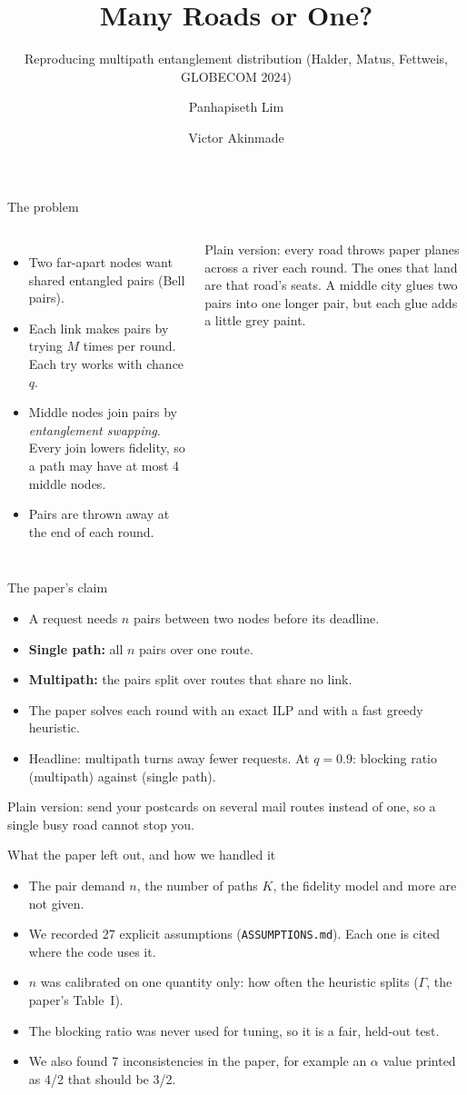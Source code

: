 \documentclass[aspectratio=169,11pt]{beamer}
\title{Many Roads or One?}
\subtitle{Reproducing multipath entanglement distribution (Halder, Matus, Fettweis, GLOBECOM 2024)}
\author{Panhapiseth Lim \and Victor Akinmade}
\institute{University of Texas of the Permian Basin}
\date{}
\newcommand{\kid}[1]{{\color{muted}\small Plain version: #1}}
\begin{document}
\begin{frame}
\titlepage
\end{frame}

\begin{frame}{The problem}
\begin{columns}[T]
\begin{itemize}
\item Two far-apart nodes want shared entangled pairs (Bell pairs).
\item Each link makes pairs by trying $M$ times per round. Each try works with chance $q$.
\item Middle nodes join pairs by \emph{entanglement swapping}. Every join lowers fidelity, so a path may have at most 4 middle nodes.
\item Pairs are thrown away at the end of each round.
\end{itemize}
\kid{every road throws paper planes across a river each round. The ones that land are that road's seats. A middle city glues two pairs into one longer pair, but each glue adds a little grey paint.}
\end{columns}
\end{frame}

\begin{frame}{The paper's claim}
\begin{itemize}
\item A request needs $n$ pairs between two nodes before its deadline.
\item \textbf{Single path:} all $n$ pairs over one route.
\item \textbf{Multipath:} the pairs split over routes that share no link.
\item The paper solves each round with an exact ILP and with a fast greedy heuristic.
\item Headline: multipath turns away fewer requests. At $q=0.9$: blocking ratio \paperBRMPILPqNine{} (multipath) against \paperBRSPILPqNine{} (single path).
\end{itemize}
\vspace{0.6em}
\kid{send your postcards on several mail routes instead of one, so a single busy road cannot stop you.}
\end{frame}

\begin{frame}{What the paper left out, and how we handled it}
\begin{itemize}
\item The pair demand $n$, the number of paths $K$, the fidelity model and more are not given.
\item We recorded 27 explicit assumptions (\texttt{ASSUMPTIONS.md}). Each one is cited where the code uses it.
\item $n$ was calibrated on one quantity only: how often the heuristic splits ($\Gamma$, the paper's Table~I).
\item The blocking ratio was never used for tuning, so it is a fair, held-out test.
\item We also found 7 inconsistencies in the paper, for example an $\alpha$ value printed as 4/2 that should be 3/2.
\end{itemize}
\end{frame}
\end{document}
